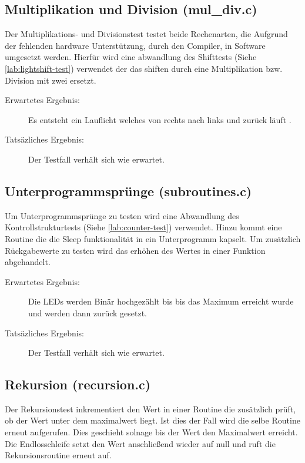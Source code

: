         \subsection{Multiplikation und Division (mul\_div.c)}
            Der Multiplikations- und Divisionstest testet beide Rechenarten, die
            Aufgrund der fehlenden hardware Unterstützung, durch den Compiler, in
            Software umgesetzt werden. Hierfür wird eine abwandlung des Shifttests
            (Siehe \ref{lab:lightshift-test}) verwendet der das shiften
            durch eine Multiplikation bzw. Division mit zwei ersetzt.

            \begin{description}
                \item[Erwartetes Ergebnis:] Es entsteht ein Lauflicht welches von
                rechts nach links und zurück läuft .
                \item[Tatsäzliches Ergebnis:] Der Testfall verhält sich wie erwartet.
            \end{description}

        \subsection{Unterprogrammsprünge (subroutines.c)}
            Um Unterprogrammsprünge zu testen wird eine Abwandlung des Kontrollstrukturtests
            (Siehe \ref{lab:counter-test}) verwendet. Hinzu kommt eine Routine die
            die Sleep funktionalität in ein Unterprogramm kapselt. Um zusätzlich Rückgabewerte zu testen
            wird das erhöhen des Wertes in einer Funktion abgehandelt.

            \begin{description}
                \item[Erwartetes Ergebnis:] Die LEDs werden Binär hochgezählt bis
                bis das Maximum erreicht wurde und werden dann zurück gesetzt.
                \item[Tatsäzliches Ergebnis:] Der Testfall verhält sich wie erwartet.
            \end{description}

        \subsection{Rekursion (recursion.c)}
            Der Rekursionstest inkrementiert den Wert in einer Routine die
            zusätzlich prüft, ob der Wert unter dem maximalwert liegt.
            Ist dies der Fall wird die selbe Routine erneut aufgerufen.
            Dies geschieht solnage bis der Wert den Maximalwert erreicht.
            Die Endlosschleife setzt den Wert anschließend wieder auf null und 
            ruft die Rekursionsroutine erneut auf.

